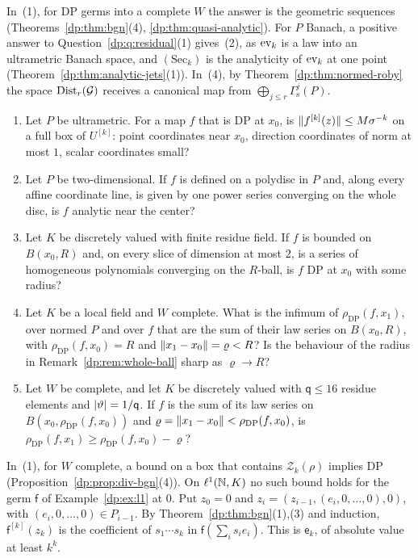 In~(1), for DP germs into a complete $W$ the answer is the geometric sequences (Theorems~\ref{dp:thm:bgn}(4), \ref{dp:thm:quasi-analytic}). For $P$ Banach, a positive answer to Question~\ref{dp:q:residual}(1) gives~(2), as $\operatorname{ev}_k$ is a law into an ultrametric Banach space, and $(\mathrm{Sec}_k)$ is the analyticity of $\operatorname{ev}_k$ at one point (Theorem~\ref{dp:thm:analytic-jets}(1)). In~(4), by Theorem~\ref{dp:thm:normed-roby} the space $\operatorname{Dist}_r(\mathcal G)$ receives a canonical map from $\bigoplus_{j\le r}\Gamma^j_{\mathrm s}(P)$.

\begin{question}\label{dp:q:quotients}
\leavevmode
\begin{enumerate}
\item Let $P$ be ultrametric. For a map $f$ that is DP at $x_0$, is $\lVert f^{[k]}(z)\rVert\le M\sigma^{-k}$ on a full box of $U^{[k]}$: point coordinates near $x_0$, direction coordinates of norm at most $1$, scalar coordinates small?
\item Let $P$ be two-dimensional. If $f$ is defined on a polydisc in $P$ and, along every affine coordinate line, is given by one power series converging on the whole disc, is $f$ analytic near the center?
\item Let $K$ be discretely valued with finite residue field. If $f$ is bounded on $B(x_0,R)$ and, on every slice of dimension at most $2$, is a series of homogeneous polynomials converging on the $R$-ball, is $f$ DP at $x_0$ with some radius?
\item Let $K$ be a local field and $W$ complete. What is the infimum of $\rho_{\mathrm{DP}}(f,x_1)$, over normed $P$ and over $f$ that are the sum of their law series on $B(x_0,R)$, with $\rho_{\mathrm{DP}}(f,x_0)=R$ and $\lVert x_1-x_0\rVert=\varrho<R$? Is the behaviour of the radius in Remark~\ref{dp:rem:whole-ball} sharp as $\varrho\to R$?
\item Let $W$ be complete, and let $K$ be discretely valued with $\mathsf q\le16$ residue elements and $\lvert \vartheta\rvert=1/\mathsf q$. If $f$ is the sum of its law series on $B(x_0,\rho_{\mathrm{DP}}(f,x_0))$ and $\varrho=\lVert x_1-x_0\rVert<\rho_{\mathrm{DP}}(f,x_0)$, is $\rho_{\mathrm{DP}}(f,x_1)\ge\rho_{\mathrm{DP}}(f,x_0)-\varrho$?
\end{enumerate}
\end{question}

In~(1), for $W$ complete, a bound on a box that contains $\mathcal Z_k(\rho)$ implies DP (Proposition~\ref{dp:prop:div-bgn}(4)). On $\ell^1(\mathbb N,K)$ no such bound holds for the germ $\mathsf f$ of Example~\ref{dp:ex:l1} at $0$. Put $z_0=0$ and $z_i=(z_{i-1},(e_i,0,\dots,0),0)$, with $(e_i,0,\dots,0)\in P_{i-1}$. By Theorem~\ref{dp:thm:bgn}(1),(3) and induction, $\mathsf f^{[k]}(z_k)$ is the coefficient of $s_1\cdots s_k$ in $\mathsf f(\sum_is_ie_i)$. This is $\mathsf e_k$, of absolute value at least $k^k$.

